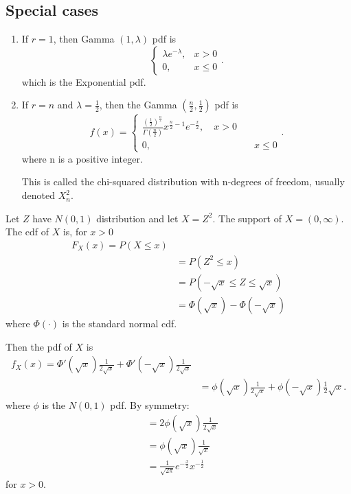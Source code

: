 \subsection{Special cases}
\begin{enumerate}
	\item If $r = 1$, then Gamma $\left( 1, \lambda \right) $ pdf is 
		\[
		\begin{cases}
			\lambda e ^{ -\lambda}, & x > 0 \\
			0, & x \le  0
		\end{cases}
		.\] 
		which is the Exponential pdf.
	\item If $r = n$ and $\lambda = \frac{1}{2}$, then the Gamma $\left( \frac{n}{2}, \frac{1}{2} \right) $ pdf is 
		\[
			f\left( x \right) = \begin{cases}
				\frac{\left( \frac{1}{2} \right) ^{\frac{n}{2}}}{\Gamma\left( \frac{n}{2} \right) }x ^{ \frac{n}{2} - 1}e ^{ -\frac{x}{2}}, \quad x > 0 \\
				0, & \quad x \le  0
			\end{cases}
		.\] 
		where n is a positive integer.

		This is called the chi-squared distribution with n-degrees of freedom, usually denoted $X^2_{n}$.
\end{enumerate}

Let $Z$ have $N\left( 0, 1 \right) $ distribution and let $X = Z^2$. The support of $X = \left( 0, \infty \right) $. The cdf of $X$ is, for $x > 0$ 
\begin{align*}
	F_{X}\left( x \right)  = P\left( X\le  x \right) \\
	&= P\left( Z^2 \le  x \right)  \\
	&= P\left( -\sqrt{x} \le  Z \le  \sqrt{x}  \right)\\
	&= \Phi\left( \sqrt{x}  \right)  - \Phi\left( -\sqrt{x}  \right) 
\end{align*}
where $\Phi\left( \cdot \right) $ is the standard normal cdf. 

Then the pdf of $X$ is 
\begin{align*}
	f _{X}\left( x \right)  = \Phi ' \left( \sqrt{x}  \right) \frac{1}{2 \sqrt{x} } + \Phi ' \left( -\sqrt{x}  \right) \frac{1}{2 \sqrt{x} }\\
	&= \phi \left( \sqrt{x}  \right) \frac{1}{2 \sqrt{x} } + \phi\left( -\sqrt{x}  \right) \frac{1}{2} \sqrt{x} 
.\end{align*}
where $\phi$ is the $N\left( 0, 1 \right) $ pdf. By symmetry:
\begin{align*}
	&= 2 \phi\left( \sqrt{x}  \right) \frac{1}{2\sqrt{x} } \\
	&= \phi\left( \sqrt{x}  \right) \frac{1}{\sqrt{x} } \\
	&= \frac{1}{\sqrt{2 \pi} }e ^{-\frac{x}{2}} x ^{-\frac{1}{2}}
\end{align*}
for $x > 0$. 
